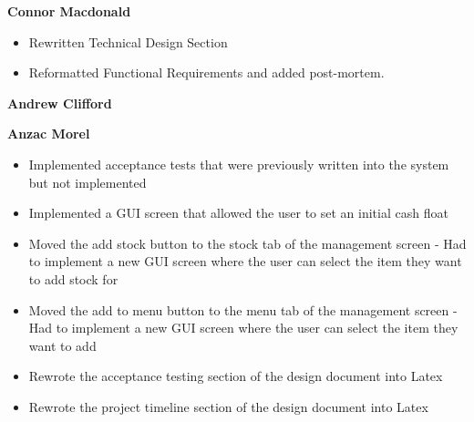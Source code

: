 
\textbf{Connor Macdonald}
\begin{itemize}
	\item Rewritten Technical Design Section
	\item Reformatted Functional Requirements and added post-mortem.
\end{itemize}

\textbf{Andrew Clifford}

\noindent\textbf{Anzac Morel}
\begin{itemize}
	\item Implemented acceptance tests that were previously written into the system but not implemented
	\item Implemented a GUI screen that allowed the user to set an initial cash float
	\item Moved the add stock button to the stock tab of the management screen - Had to implement a new GUI screen where the user can select the item they want to add stock for
	\item Moved the add to menu button to the menu tab of the management screen - Had to implement a new GUI screen where the user can select the item they want to add
	\item Rewrote the acceptance testing section of the design document into Latex
	\item Rewrote the project timeline section of the design document into Latex
\end{itemize}